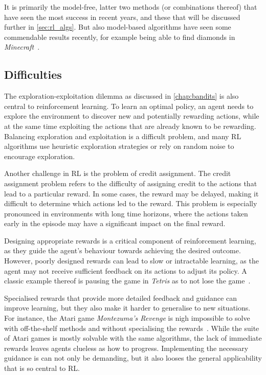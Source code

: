 It is primarily the model-free, latter two methods (or combinations thereof) that have seen the most success in recent years, and these that will be discussed further in \cref{sec:rl_algs}.
But also model-based algorithms have seen some commendable results recently, for example being able to find diamonds in \textit{Minecraft}~\autocite{hafner2023}.


\subsection{Difficulties}
\label{sec:difficulties}
The exploration-exploitation dilemma as discussed in \cref{chap:bandits} is also central to reinforcement learning.
To learn an optimal policy, an agent needs to explore the environment to discover new and potentially rewarding actions, while at the same time exploiting the actions that are already known to be rewarding.
Balancing exploration and exploitation is a difficult problem, and many RL algorithms use heuristic exploration strategies or rely on random noise to encourage exploration.

Another challenge in RL is the problem of credit assignment.
The credit assignment problem refers to the difficulty of assigning credit to the actions that lead to a particular reward.
In some cases, the reward may be delayed, making it difficult to determine which actions led to the reward.
This problem is especially pronounced in environments with long time horizons, where the actions taken early in the episode may have a significant impact on the final reward.

Designing appropriate rewards is a critical component of reinforcement learning, as they guide the agent's behaviour towards achieving the desired outcome.
However, poorly designed rewards can lead to slow or intractable learning, as the agent may not receive sufficient feedback on its actions to adjust its policy.
A classic example thereof is pausing the game in \textit{Tetris} as to not lose the game~\autocite{murphy2013}.

Specialised rewards that provide more detailed feedback and guidance can improve learning, but they also make it harder to generalise to new situations.
For instance, the Atari game \textit{Montezuma's Revenge} is nigh impossible to solve with off-the-shelf methods and without specialising the rewards~\autocite{salimans2018}.
While the suite of Atari games is mostly solvable with the same algorithms, the lack of immediate rewards leaves agents clueless as how to progress.
Implementing the necessary guidance is can not only be demanding, but it also looses the general applicability that is so central to RL.

